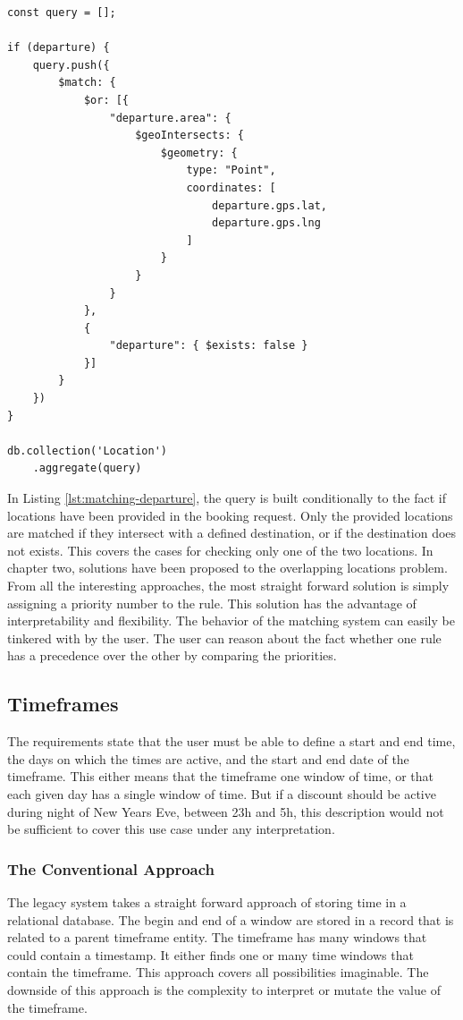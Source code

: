 \begin{center}
\noindent\begin{minipage}{.85\textwidth}
\begin{lstlisting}[caption={Matching departure.}, label={lst:matching-departure}]
const query = [];

if (departure) {
	query.push({
		$match: {
			$or: [{
				"departure.area": {
					$geoIntersects: {
						$geometry: {
							type: "Point",
							coordinates: [
								departure.gps.lat,
								departure.gps.lng
							]
						}
					}
				}
			},
			{
				"departure": { $exists: false }
			}]
		}
	})
}

db.collection('Location')
	.aggregate(query)
\end{lstlisting}
\end{minipage}
\end{center}

In Listing \ref{lst:matching-departure}, the query is built conditionally to the fact if locations have been provided in the booking request. Only the provided locations are matched if they intersect with a defined destination, or if the destination does not exists. This covers the cases for checking only one of the two locations. In chapter two, solutions have been proposed to the overlapping locations problem. From all the interesting approaches, the most straight forward solution is simply assigning a priority number to the rule. This solution has the advantage of interpretability and flexibility. The behavior of the matching system can easily be tinkered with by the user. The user can reason about the fact whether one rule has a precedence over the other by comparing the priorities.

\subsection{Timeframes}
The requirements state that the user must be able to define a start and end time, the days on which the times are active, and the start and end date of the timeframe. This either means that the timeframe one window of time, or that each given day has a single window of time. But if a discount should be active during night of New Years Eve, between 23h and 5h, this description would not be sufficient to cover this use case under any interpretation.

\subsubsection{The Conventional Approach}
The legacy system takes a straight forward approach of storing time in a relational database. The begin and end of a window are stored in a record that is related to a parent timeframe entity. The timeframe has many windows that could contain a timestamp. It either finds one or many time windows that contain the timeframe. This approach covers all possibilities imaginable. The downside of this approach is the complexity to interpret or mutate the value of the timeframe.


